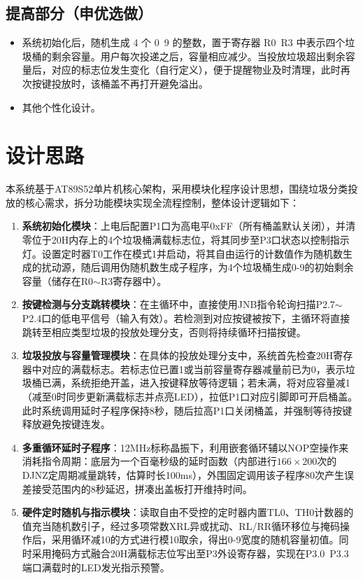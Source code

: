 \documentclass[12pt,a4paper]{article}
\begin{document}
\subsection{提高部分（申优选做）}
\begin{itemize}
    \item 系统初始化后，随机生成 4 个 0~9 的整数，置于寄存器 R0~R3 中表示四个垃圾桶的剩余容量。用户每次投递之后，容量相应减少。当投放垃圾超出剩余容量后，对应的标志位发生变化（自行定义），便于提醒物业及时清理，此时再次按键投放时，该桶盖不再打开避免溢出。
    \item 其他个性化设计。
\end{itemize}

\section{设计思路}
本系统基于AT89S52单片机核心架构，采用模块化程序设计思想，围绕垃圾分类投放的核心需求，拆分功能模块实现全流程控制，整体设计逻辑如下：
\begin{enumerate}
    \item \textbf{系统初始化模块}：上电后配置P1口为高电平0xFF（所有桶盖默认关闭），并清零位于20H内存上的4个垃圾桶满载标志位，将其同步至P3口状态以控制指示灯。设置定时器T0工作在模式1并启动，将其自由运行的计数值作为随机数生成的扰动源，随后调用伪随机数生成子程序，为4个垃圾桶生成0-9的初始剩余容量（储存在R0$\sim$R3寄存器中）。
    \item \textbf{按键检测与分支跳转模块}：在主循环中，直接使用JNB指令轮询扫描P2.7$\sim$P2.4口的低电平信号（输入有效）。若检测到对应按键被按下，主循环将直接跳转至相应类型垃圾的投放处理分支，否则将持续循环扫描按键。
    \item \textbf{垃圾投放与容量管理模块}：在具体的投放处理分支中，系统首先检查20H寄存器中对应的满载标志。若标志位已置1或当前容量寄存器减量前已为0，表示垃圾桶已满，系统拒绝开盖，进入按键释放等待逻辑；若未满，将对应容量减1（减至0时同步更新满载标志并点亮LED），拉低P1口对应引脚即可开启桶盖。此时系统调用延时子程序保持8秒，随后拉高P1口关闭桶盖，并强制等待按键释放避免按键连发。
    \item \textbf{多重循环延时子程序}：12MHz标称晶振下，利用嵌套循环辅以NOP空操作来消耗指令周期：底层为一个百毫秒级的延时函数（内部进行$166 \times 200$次的DJNZ定周期减量跳转，估算时长100ms），外围固定调用该子程序80次产生误差接受范围内的8秒延迟，拼凑出盖板打开维持时间。
    \item \textbf{硬件定时随机与指示模块}：读取自由不受控的定时器内置TL0、TH0计数器的值充当随机数引子，经过多项常数XRL异或扰动、RL/RR循环移位与掩码操作后，采用循环减10的方式进行模10取余，得出0-9宽度的随机容量初值。同时采用掩码方式融合20H满载标志位写出至P3外设寄存器，实现在P3.0~P3.3端口满载时的LED发光指示预警。
\end{enumerate}
\end{document}
